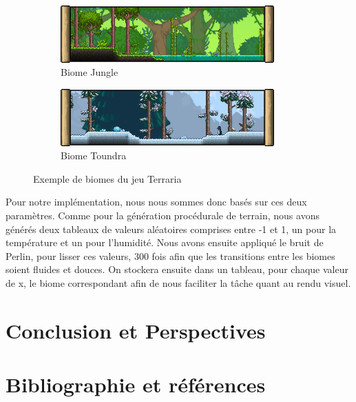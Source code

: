 \documentclass{article}
\begin{document}
\begin{figure}[!h]
  \centering
  \begin{subfigure}[b]{0.4\textwidth}
    \centering
    \includegraphics[width=0.9\textwidth]{assets/jungle.png}
    \caption{Biome Jungle}
    \label{jungle}
  \end{subfigure}
  \hspace{1cm}
  \begin{subfigure}[b]{0.4\textwidth}
    \centering
    \includegraphics[width=0.9\textwidth]{assets/toundra.png}
    \caption{Biome Toundra}
    \label{toundra}
  \end{subfigure}
  \caption{Exemple de biomes du jeu Terraria}
  \label{biomes}
\end{figure}

Pour notre implémentation, nous nous sommes donc basés sur ces deux paramètres. Comme pour la génération procédurale de terrain, nous avons générés deux tableaux de valeurs aléatoires comprises entre -1 et 1, un pour la température et un pour l'humidité. Nous avons ensuite appliqué le bruit de Perlin, pour lisser ces valeurs, 300 fois afin que les transitions entre les biomes soient fluides et douces. On stockera ensuite dans un tableau, pour chaque valeur de x, le biome correspondant afin de nous faciliter la tâche quant au rendu visuel.

\section{Conclusion et Perspectives}
\newpage

\section{Bibliographie et références}


\end{document}
